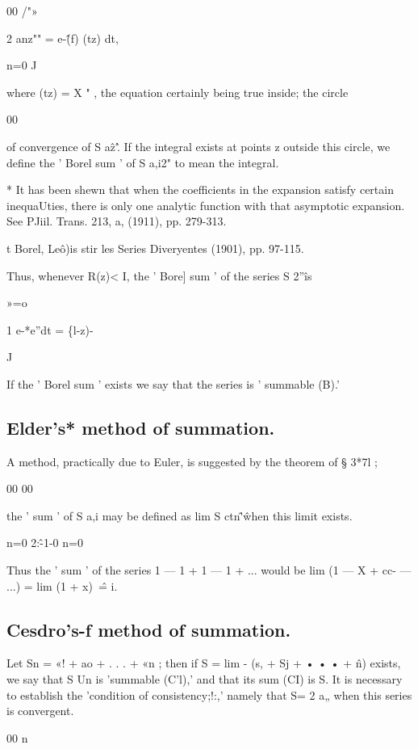 00 /"»

2 anz"" = e-\^(f) (tz) dt,

n=0 J

where (tz) = X " , the equation certainly being true inside; the circle

00

of convergence of S a\^z'\^. If the integral exists at points z
outside this circle, we define the ' Borel sum ' of S a,i2" to mean the integral.

* It has been shewn that when the coefficients in the expansion
satisfy certain inequaUties, there is only one analytic function with
that asymptotic expansion. See PJiil. Trans. 213, a, (1911), pp.
279-313.

t Borel, Le\^o)is stir les Series Diveryentes (1901), pp. 97-115.



% 
% 

Thus, whenever R(z)< I, the ' Bore] sum ' of the series S 2''\^ is

»=o

1 e-*e''dt = \{l-z)-\

J

If the ' Borel sum ' exists we say that the series is ' summable (B).'

\subsection{Elder's* method of summation.}
A method, practically due to Euler, is suggested by the theorem of § 3*7l ;

00 00

the ' sum ' of S a,i may be defined as lim S ctn\^'\^ when this limit exists.

n=0 2:\^-1-0 n=0

Thus the ' sum ' of the series 1 — 1 + 1 — 1 + ... would be
lim (1 — X + cc- — ...) = lim (1 + x)~\^ = i.

\subsection{Cesdro's-f method of summation.}

Let Sn = «! + ao + . . . + «n ; then if S = lim - (s, + Sj + • • • +
\^n) exists, we say that S Un is 'summable (C'l),' and that its sum
(CI) is S. It is necessary to establish the 'condition of
consistency;!:,' namely that S= 2 a„ when this series is convergent.

00 n

